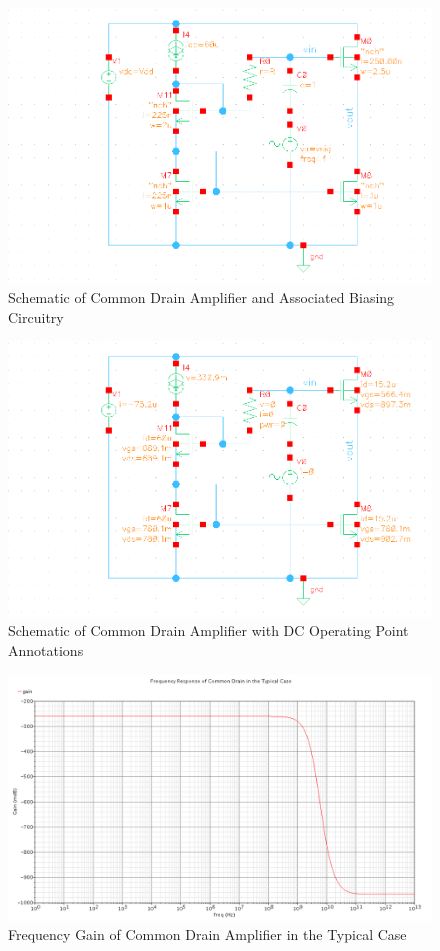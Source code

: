 \documentclass{article}
\begin{document}
\begin{figure}[H]
\centering
\includegraphics[width=7in]{2_cd_schematic.png}
\caption{Schematic of Common Drain Amplifier and Associated Biasing Circuitry}
\label{cd_schem}
\end{figure}

\begin{figure}[H]
\centering
\includegraphics[width=7in]{2_cd_dcop.png}
\caption{Schematic of Common Drain Amplifier with DC Operating Point Annotations}
\label{cd_dcop}
\end{figure}

\begin{figure}[H]
\centering
\includegraphics[width=5in]{2_cd_gain_tt.png}
\caption{Frequency Gain of Common Drain Amplifier in the Typical Case}
\label{cd_tt}
\end{figure}
\end{document}
